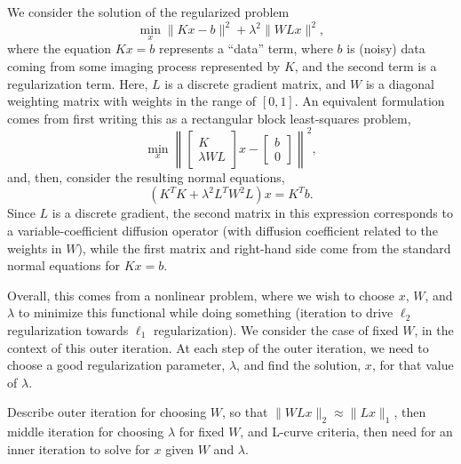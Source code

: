 
We consider the solution of the regularized problem
\begin{equation}
\label{eq:regularized}
\min_{x} \|Kx-b\|^2 + \lambda^2\|WLx\|^2,
\end{equation}
where the equation $Kx=b$ represents a ``data'' term, where $b$ is
(noisy) data coming from some imaging process represented by $K$, and
the second term is a regularization term.  Here, $L$ is a discrete
gradient matrix, and $W$ is a diagonal weighting matrix with weights
in the range of $[0,1]$.  An equivalent formulation comes from first
writing this as a rectangular block least-squares problem,
\[
\min_{x} \left\| \left[\begin{array}{c} K \\ \lambda
      WL\end{array}\right]x - \left[\begin{array}{c} b \\ 0 \end{array}\right]\right\|^2,
\]
and, then, consider the resulting normal equations,
\begin{equation}
\label{eq:normal}
\left(K^TK + \lambda^2 L^TW^2L\right)x = K^Tb.
\end{equation}
Since $L$ is a discrete gradient, the second matrix in this expression
corresponds to a variable-coefficient diffusion operator (with
diffusion coefficient related to the weights in $W$), while the first
matrix and right-hand side come from the standard normal equations for
$Kx=b$.

Overall, this comes from a nonlinear problem, where we wish to choose
$x$, $W$, and $\lambda$ to minimize this functional while doing
something (iteration to drive $\ell_2$ regularization towards $\ell_1$
regularization).  We consider the case of fixed $W$, in the context of
this outer iteration.  At each step of the outer iteration, we need to
choose a good regularization parameter, $\lambda$, and find the
solution, $x$, for that value of $\lambda$.

Describe outer iteration for choosing $W$, so that $\|WLx\|_2 \approx
\|Lx\|_1$, then middle iteration for choosing $\lambda$ for fixed $W$,
and L-curve criteria, then need for an inner iteration to solve for
$x$ given $W$ and $\lambda$.
